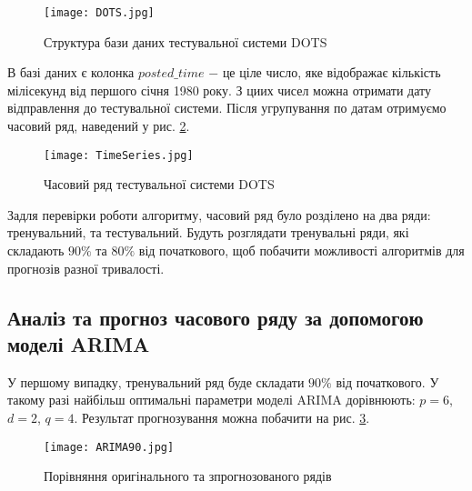 \vspace{1em}

\begin{figure}[h]
  \texttt{[image: DOTS.jpg]}
  \caption{Структура бази даних тестувальної системи DOTS}
  \label{fig:DOTS}
\end{figure}

В базі даних є колонка $posted\_time$ $-$ це ціле число, яке відображає кількість мілісекунд від першого січня 1980 року. З циих чисел можна отримати дату відправлення до тестувальної системи. Після угрупування по датам отримуємо часовий ряд, наведений у рис. \ref{fig:TimeSeries}.



\vspace{1em}

\begin{figure}[h]
  \texttt{[image: TimeSeries.jpg]}
  \caption{Часовий ряд тестувальної системи DOTS}
  \label{fig:TimeSeries}
\end{figure}

Задля перевірки роботи алгоритму, часовий ряд було розділено на два ряди: тренувальний, та тестувальний. Будуть розглядати тренувальні ряди, які складають $90\%$ та $80\%$ від початкового, щоб побачити можливості алгоритмів для прогнозів разної тривалості.

\subsection{Аналіз та прогноз часового ряду за допомогою моделі ARIMA}

У першому випадку, тренувальний ряд буде складати $90\%$ від початкового. У такому разі найбільш оптимальні параметри моделі ARIMA дорівнюють: $p = 6$, $d = 2$, $q = 4$. Результат прогнозування можна побачити на рис. \ref{fig:ARIMA90}.

\vspace{1em}

\begin{figure}[h]
  \texttt{[image: ARIMA90.jpg]}
  \caption{Порівняння оригінального та зпрогнозованого рядів}
  \label{fig:ARIMA90}
\end{figure}

